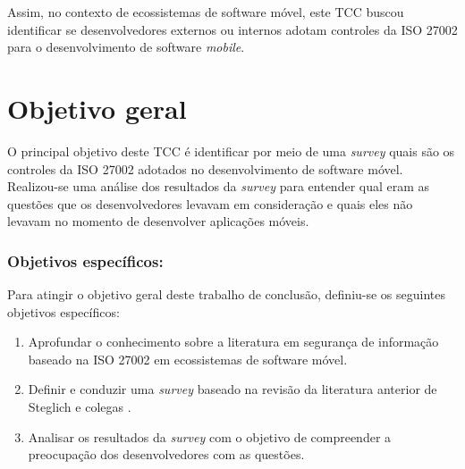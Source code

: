 Assim, no contexto de ecossistemas de software móvel, este TCC  buscou identificar se desenvolvedores externos ou internos adotam controles da ISO 27002 para o desenvolvimento de software \textit{mobile}.




\section{Objetivo geral}

O principal objetivo deste TCC é identificar por meio de uma \textit{survey} quais são os controles da ISO 27002 adotados no desenvolvimento de software móvel. Realizou-se uma análise dos resultados da \textit{survey} para entender qual eram as questões que os desenvolvedores levavam em consideração e quais eles não levavam no momento de desenvolver aplicações móveis.

 
\subsubsection{\textbf{Objetivos específicos:}}

Para atingir o objetivo geral deste trabalho de conclusão, definiu-se os seguintes objetivos específicos:

\begin{enumerate}
    \item Aprofundar o conhecimento sobre a literatura em segurança de informação baseado na ISO 27002 em ecossistemas de software móvel.
    
    \item Definir e conduzir uma \textit{survey} baseado na revisão da literatura anterior de Steglich e colegas \cite{caio2019}.
    
    \item Analisar os resultados da \textit{survey} com o objetivo de compreender a preocupação dos desenvolvedores com as questões.
    
    
\end{enumerate}


      



